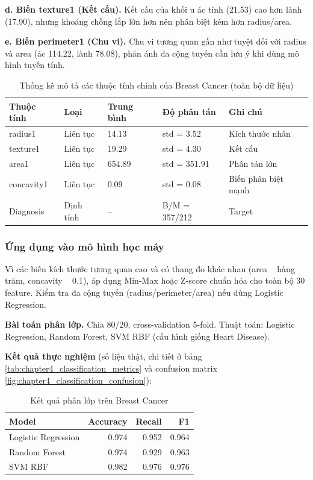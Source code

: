 \textbf{d. Biến texture1 (Kết cấu).} Kết cấu của khối u ác tính (21.53) cao hơn lành (17.90), nhưng khoảng chồng lắp lớn hơn nên phân biệt kém hơn radius/area.

\textbf{e. Biến perimeter1 (Chu vi).} Chu vi tương quan gần như tuyệt đối với radius và area (ác 114.22, lành 78.08), phản ánh đa cộng tuyến cần lưu ý khi dùng mô hình tuyến tính.

\begin{table}[H]
\centering
\caption{Thống kê mô tả các thuộc tính chính của Breast Cancer (toàn bộ dữ liệu)}
\label{tab:breast_descriptive_stats}
\small
\begin{tabular}{lllll}
\toprule
Thuộc tính & Loại & Trung bình & Độ phân tán & Ghi chú \\
\midrule
radius1 & Liên tục & 14.13 & std = 3.52 & Kích thước nhân \\
texture1 & Liên tục & 19.29 & std = 4.30 & Kết cấu \\
area1 & Liên tục & 654.89 & std = 351.91 & Phân tán lớn \\
concavity1 & Liên tục & 0.09 & std = 0.08 & Biến phân biệt mạnh \\
Diagnosis & Định tính & -- & B/M = 357/212 & Target \\
\bottomrule
\end{tabular}
\end{table}

\subsubsection{Ứng dụng vào mô hình học máy}

Vì các biến kích thước tương quan cao và có thang đo khác nhau (area ~ hàng trăm, concavity ~ 0.1), áp dụng Min-Max hoặc Z-score chuẩn hóa cho toàn bộ 30 feature. Kiểm tra đa cộng tuyến (radius/perimeter/area) nếu dùng Logistic Regression.

\textbf{Bài toán phân lớp.} Chia 80/20, cross-validation 5-fold. Thuật toán: Logistic Regression, Random Forest, SVM RBF (cấu hình giống Heart Disease).

\textbf{Kết quả thực nghiệm} (số liệu thật, chi tiết ở bảng \ref{tab:chapter4_classification_metrics} và confusion matrix \ref{fig:chapter4_classification_confusion}):

\begin{table}[H]
\centering
\caption{Kết quả phân lớp trên Breast Cancer}
\label{tab:breast_ml_results}
\small
\begin{tabular}{lrrr}
\toprule
Model & Accuracy & Recall & F1 \\
\midrule
Logistic Regression & 0.974 & 0.952 & 0.964 \\
Random Forest & 0.974 & 0.929 & 0.963 \\
SVM RBF & 0.982 & 0.976 & 0.976 \\
\bottomrule
\end{tabular}
\end{table}

